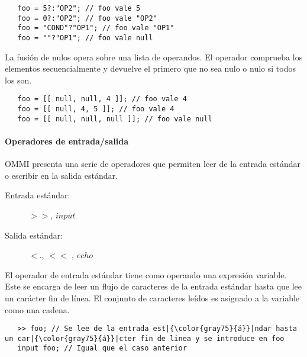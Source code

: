 \begin{lstlisting}
   foo = 5?:"OP2"; // foo vale 5
   foo = 0?:"OP2"; // foo vale "OP2"
   foo = "COND"?"OP1"; // foo vale "OP1"
   foo = ""?"OP1"; // foo vale null
\end{lstlisting} 

La fusión de nulos opera sobre una lista de operandos. El operador comprueba los elementos secuencialmente y devuelve el primero que no sea nulo o nulo si todos los son. \\

\begin{lstlisting}
   foo = [[ null, null, 4 ]]; // foo vale 4
   foo = [[ null, 4, 5 ]]; // foo vale 4
   foo = [[ null, null, null ]]; // foo vale null
\end{lstlisting}


\paragraph{Operadores de entrada/salida} \label{sec:op_io}
OMMI presenta una serie de operadores que permiten leer de la entrada estándar o
escribir en la salida estándar.

\begin{description}
\item [Entrada estándar:] $>>$, $input$
\item [Salida estándar:] $<.$, $<<$ , $echo$
\end{description} 

El operador de entrada estándar tiene como operando una expresión variable. Este se encarga de leer un flujo de caracteres de
la entrada estándar hasta que lee un carácter fin de línea. El conjunto de caracteres leídos es asignado a la variable como
una cadena. \\

\begin{lstlisting}
   >> foo; // Se lee de la entrada est|{\color{gray75}{á}}|ndar hasta un car|{\color{gray75}{á}}|cter fin de linea y se introduce en foo
   input foo; // Igual que el caso anterior
\end{lstlisting}

